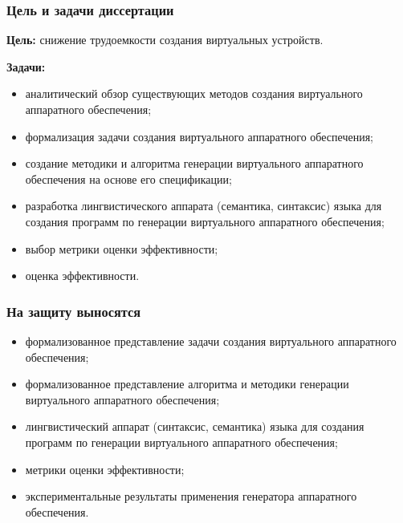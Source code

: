 \begin{frame}%
    \frametitle{Цель и задачи диссертации}
    \textbf{Цель:} снижение трудоемкости создания виртуальных устройств.

    \textbf{Задачи:}
    \begin{itemize}
        \item аналитический обзор существующих методов создания виртуального аппаратного обеспечения;
        \item формализация задачи создания виртуального аппаратного обеспечения;
        \item создание методики и алгоритма генерации виртуального аппаратного обеспечения на основе его спецификации;
        \item разработка лингвистического аппарата (семантика, синтаксис) языка для создания программ по генерации виртуального
            аппаратного обеспечения;
        \item выбор метрики оценки эффективности;
        \item оценка эффективности.
    \end{itemize}
\end{frame}


\begin{frame}%
    \frametitle{На защиту выносятся}
    \begin{itemize}
        \item формализованное представление задачи создания виртуального аппаратного обеспечения;
        \item формализованное представление алгоритма и методики генерации виртуального аппаратного обеспечения;
        \item лингвистический аппарат (синтаксис, семантика) языка для создания программ по генерации виртуального
            аппаратного обеспечения;
        \item метрики оценки эффективности;
        \item экспериментальные результаты применения генератора аппаратного обеспечения.
    \end{itemize}
\end{frame}


